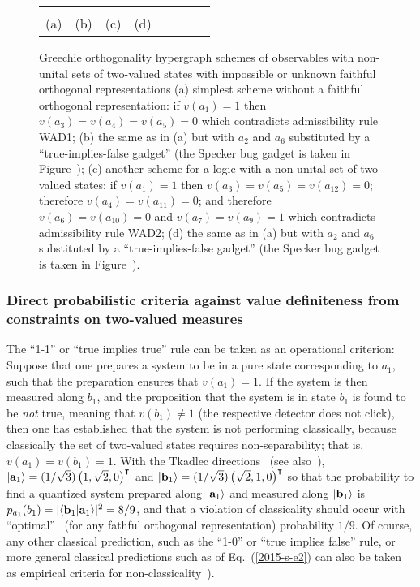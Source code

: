 \begin{figure*}
\begin{center}
\begin{tabular}{ c c c c c c c c }
\begin{tikzpicture}  [scale=1]
\end{tikzpicture}
\\
(a)&(b)&(c)&(d)
\end{tabular}
\end{center}
\caption{\label{2020-f-nun-unital-schemes}
Greechie orthogonality hypergraph schemes of observables with non-unital sets of two-valued states with impossible
or unknown faithful orthogonal representations
(a) simplest scheme without a faithful orthogonal representation: if
$v(a_1)=1$ then
$v(a_3)=v(a_4)=v(a_5)=0$ which contradicts admissibility rule WAD1;
(b) the same as in (a) but with $a_2$ and $a_6$ substituted by a ``true-implies-false gadget''
(the Specker bug gadget is taken in Figure~\cite[Fig.~2.4 and~6.3]{svozil-tkadlec});
(c) another scheme for a logic with a non-unital set of two-valued states:  if
 $v(a_1)=1$ then
$v(a_3)=v(a_5)=v(a_{12})=0$;
therefore
$v(a_4)=v(a_{11})=0$; and therefore
$v(a_6)=v(a_{10})=0$
and
$v(a_7)=v(a_9)=1$
which contradicts admissibility rule WAD2;
(d)  the same as in (a) but with $a_2$ and $a_6$ substituted by a ``true-implies-false gadget''
(the Specker bug gadget is taken in Figure~\cite[Fig.~7.3]{svozil-tkadlec}).
}
\end{figure*}


\subsubsection{Direct probabilistic criteria against value definiteness from constraints on two-valued measures}
\label{2017-b-ss-pc}

The ``1-1'' or  ``true implies true'' rule can be taken as an operational criterion:
Suppose that one prepares a system to be in a pure state
corresponding to $a_1$, such that the preparation ensures that $v(a_1)=1$.
If the system is then measured along $b_1$, and the proposition that
the system is in state $b_1$  is found  to be {\em not} true, meaning that $v(b_1)\neq 1$ (the respective detector does not click),
then  one has established that the system is not performing classically,
because classically the set of two-valued states requires non-separability; that is, $v(a_1)=v(b_1)=1$.
With the Tkadlec directions~\cite[p.~206, Fig.~1]{tkadlec-96}
(see also~\cite[Fig.~4, p.~5387]{svozil-tkadlec}),
$\vert {\bf a}_1\rangle = (1/\sqrt{3}) \left(    1,\sqrt{2},0     \right)^\intercal$ and
$\vert {\bf b}_1\rangle = (1/\sqrt{3})\left(     \sqrt{2},1,0      \right)^\intercal$
so that the probability to find a quantized system prepared along $\vert {\bf a}_1\rangle$
and measured along $\vert {\bf b}_1\rangle$ is
$p_{a_1}(b_1) = \vert \langle {\bf b}_1 \vert {\bf a}_1 \rangle \vert^2=  8/9  $,
and that a violation of classicality should occur with ``optimal''~\cite{cabello-1994,Cabello-1996-diss,svozil-tkadlec} (for any fathful orthogonal representation)
probability $1/9$.
Of course, any other classical prediction, such as the ``1-0'' or ``true implies false'' rule,
or more general  classical predictions such as of Eq.~(\ref{2015-s-e2})
can also be taken as empirical criteria for non-classicality~\cite[Section~11.3.2.]{svozil-2016-s}).

